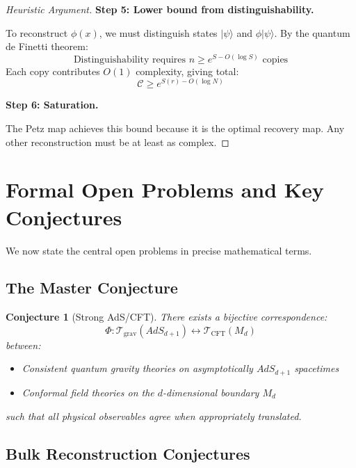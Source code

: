 \documentclass[12pt,a4paper]{article}
\newtheorem{conjecture}[theorem]{Conjecture}
\begin{document}
\begin{proof}[Heuristic Argument]
\textbf{Step 5: Lower bound from distinguishability.}

To reconstruct $\phi(x)$, we must distinguish states $|\psi\rangle$ and $\phi|\psi\rangle$. By the quantum de Finetti theorem:
\begin{equation}
\text{Distinguishability requires } n \geq e^{S - O(\log S)} \text{ copies}
\end{equation}
Each copy contributes $O(1)$ complexity, giving total:
\begin{equation}
\mathcal{C} \geq e^{S(r) - O(\log N)}
\end{equation}

\textbf{Step 6: Saturation.}

The Petz map achieves this bound because it is the optimal recovery map. Any other reconstruction must be at least as complex.
\end{proof}

\section{Formal Open Problems and Key Conjectures}

We now state the central open problems in precise mathematical terms.

\subsection{The Master Conjecture}

\begin{conjecture}[Strong AdS/CFT]
There exists a bijective correspondence:
\begin{equation}
\Phi: \mathcal{T}_{\text{grav}}(AdS_{d+1}) \longleftrightarrow \mathcal{T}_{\text{CFT}}(M_d)
\end{equation}
between:
\begin{itemize}
    \item Consistent quantum gravity theories on asymptotically $AdS_{d+1}$ spacetimes
    \item Conformal field theories on the $d$-dimensional boundary $M_d$
\end{itemize}
such that all physical observables agree when appropriately translated.
\end{conjecture}

\subsection{Bulk Reconstruction Conjectures}
\end{document}
